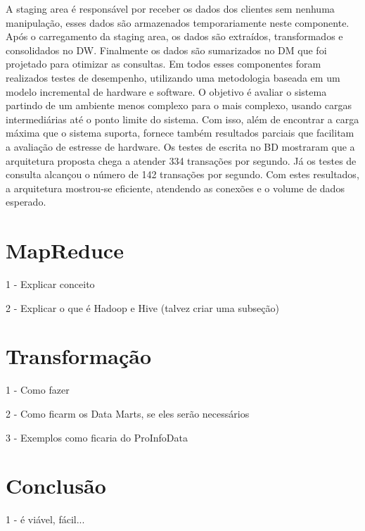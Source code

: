 \documentclass[a4paper,12pt]{article}
\begin{document}
A staging area é responsável por receber os dados dos clientes sem nenhuma manipulação, 
esses dados são armazenados temporariamente neste componente. Após o carregamento da 
staging area, os dados são extraídos, transformados e consolidados no DW. Finalmente os
dados são sumarizados no DM que foi projetado para otimizar as consultas. Em todos 
esses componentes foram realizados testes de desempenho, utilizando uma metodologia 
baseada em um modelo incremental de hardware e software. O objetivo é avaliar o sistema
 partindo de um ambiente menos complexo para o mais complexo, usando cargas
 intermediárias até o ponto limite do sistema. Com isso, além de encontrar a carga 
máxima que o sistema suporta, fornece também resultados parciais que facilitam a
 avaliação de estresse de hardware.  Os testes de escrita no BD mostraram que a 
arquitetura proposta chega a atender 334 transações por segundo. Já os testes de 
consulta alcançou o número de 142 transações por segundo. Com estes resultados, a
 arquitetura mostrou-se eficiente, atendendo as conexões e o volume de dados esperado.

\section{\textbf{MapReduce}}
1 - Explicar conceito

2 - Explicar o que é Hadoop e Hive (talvez criar uma subseção)

\section{\textbf{Transformação}}
1 - Como fazer

2 - Como ficarm os Data Marts, se eles serão necessários

3 - Exemplos como ficaria do ProInfoData

\section{\textbf{Conclusão}}
1 - é viável, fácil...



\end{document}
